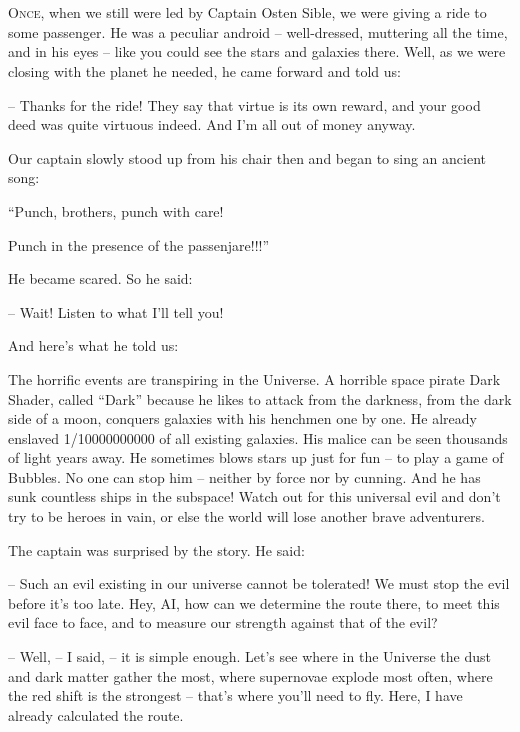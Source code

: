 \documentclass[ebook,twoside,final,openright]{memoir}
\begin{document}
\chapter{}
\par
\lettrine{O}{nce,} when we still were led by Captain Osten Sible, we were giving a ride to some passenger. He was a peculiar android – well-dressed, muttering all the time, and in his eyes – like you could see the stars and galaxies there. Well, as we were closing with the planet he needed, he came forward and told us: \par
\par
– Thanks for the ride! They say that virtue is its own reward, and your good deed was quite virtuous indeed. And I’m all out of money anyway.\par
Our captain slowly stood up from his chair then and began to sing an ancient song: \par
“Punch, brothers, punch with care! \par
 Punch in the presence of the passenjare!!!” \par
He became scared. So he said:\par
– Wait! Listen to what I’ll tell you! \par
 And here’s what he told us:\par
\par
The horrific events are transpiring in the Universe. A horrible space pirate Dark Shader, called “Dark” because he likes to attack from the darkness, from the dark side of a moon, conquers galaxies with his henchmen one by one. He already enslaved 1/10000000000 of all existing galaxies. His malice can be seen thousands of light years away. He sometimes blows stars up just for fun – to play a game of Bubbles. No one can stop him – neither by force nor by cunning. And he has sunk countless ships in the subspace! Watch out for this universal evil and don’t try to be heroes in vain, or else the world will lose another brave adventurers.\par
\par
The captain was surprised by the story. He said:\par
– Such an evil existing in our universe cannot be tolerated! We must stop the evil before it’s too late. Hey, AI, how can we determine the route there, to meet this evil face to face, and to measure our strength against that of the evil?\par
– Well, – I said, – it is simple enough. Let's see where in the Universe the dust and dark matter gather the most, where supernovae explode most often, where the red shift is the strongest – that’s where you’ll need to fly. Here, I have already calculated the route.\par
\end{document}
